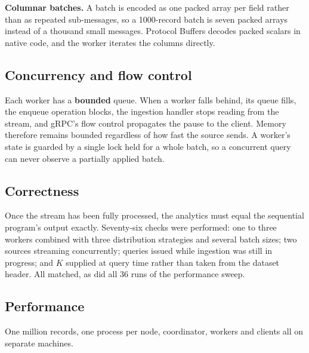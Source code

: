 \documentclass[11pt,a4paper]{article}
\begin{document}
\textbf{Columnar batches.} A batch is encoded as one packed array per field rather than
as repeated sub-messages, so a 1000-record batch is seven packed arrays instead of a
thousand small messages. Protocol Buffers decodes packed scalars in native code, and the
worker iterates the columns directly.

\subsection{Concurrency and flow control}
Each worker has a \textbf{bounded} queue. When a worker falls behind, its queue fills,
the enqueue operation blocks, the ingestion handler stops reading from the stream, and
gRPC's flow control propagates the pause to the client. Memory therefore remains bounded
regardless of how fast the source sends. A worker's state is guarded by a single lock
held for a whole batch, so a concurrent query can never observe a partially applied
batch.

\subsection{Correctness}
Once the stream has been fully processed, the analytics must equal the sequential
program's output exactly. Seventy-six checks were performed: one to three workers
combined with three distribution strategies and several batch sizes; two sources
streaming concurrently; queries issued while ingestion was still in progress; and $K$
supplied at query time rather than taken from the dataset header. All matched, as did
all 36 runs of the performance sweep.

\subsection{Performance}
One million records, one process per node, coordinator, workers and clients all on
separate machines.
\end{document}

